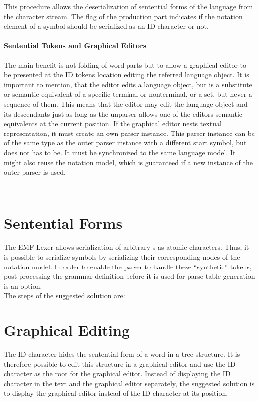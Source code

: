 This procedure allows the deserialization of sentential forms of the language from the character stream. The  flag of the production part indicates if the notation element of a symbol should be serialized as an ID character or not. 


\paragraph{Sentential Tokens and Graphical Editors}
The main benefit is not folding of word parts but to allow a graphical editor to be presented at the ID tokens location editing the referred language object. It is important to mention, that the editor edits a language object, but is a substitute or semantic equivalent of a specific terminal or nonterminal, or a set, but never a sequence of them. This means that the editor may edit the language object and its descendants just as long as the unparser allows one of the editors semantic equivalents at the current position. If the graphical editor nests textual representation, it must create an own parser instance. This parser instance can be of the same type as the outer parser instance with a different start symbol, but does not has to be. It must be synchronized to the same language model. It might also reuse the notation model, which is guaranteed if a new instance of the outer parser is used.

 \\


\section{Sentential Forms}
The EMF Lexer  allows serialization of arbitrary s as atomic characters. Thus, it is possible to serialize symbols by serializing their corresponding nodes of the notation model. In order to enable the parser to handle these ``synthetic'' tokens, post processing the grammar definition before it is used for parse table generation is an option. \\
The steps of the suggested solution are:


\section{Graphical Editing}
The ID character hides the sentential form of a word in a tree structure. It is therefore possible to edit this structure in a graphical editor and use the ID character as the root for the graphical editor. Instead of displaying the ID character in the text and the graphical editor separately, the suggested solution is to display the graphical editor instead of the ID character at its position.

